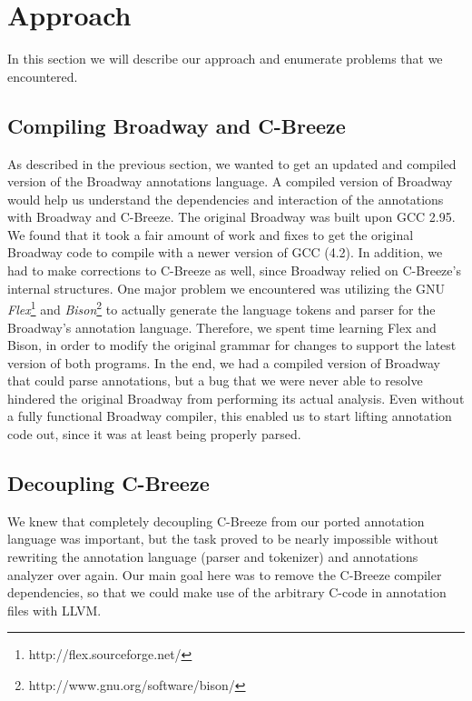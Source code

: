 \chapter{Approach}
In this section we will describe our approach and enumerate problems that we encountered.

\section {Compiling Broadway and C-Breeze}

As described in the previous section, we wanted to get an updated and compiled version of the Broadway annotations language. A compiled version of Broadway would help us understand the dependencies and interaction of the annotations with Broadway and C-Breeze.  The original Broadway was built upon GCC 2.95. We found that it took a fair amount of work and fixes to get the original Broadway code to compile with a newer version of GCC (4.2). In addition, we had to make corrections to C-Breeze as well, since Broadway relied on C-Breeze's internal structures. One major problem we encountered was utilizing the GNU \textit{Flex}\footnote{http://flex.sourceforge.net/} and \textit{Bison}\footnote{http://www.gnu.org/software/bison/} to actually generate the language tokens and parser for the Broadway's annotation language. Therefore, we spent time learning Flex and Bison, in order to modify the original grammar for changes to support the latest version of both programs.  In the end, we had a compiled version of Broadway that could parse annotations, but a bug that we were never able to resolve hindered the original Broadway from performing its actual analysis. Even without a fully functional Broadway compiler, this enabled us to start lifting annotation code out, since it was at least being properly parsed.

\section {Decoupling C-Breeze}

We knew that completely decoupling C-Breeze from our ported annotation language was important, but the task proved to be nearly impossible without rewriting the annotation language (parser and tokenizer) and annotations analyzer over again. Our main goal here was to remove the C-Breeze compiler dependencies, so that we could make use of the arbitrary C-code in annotation files with LLVM. 

